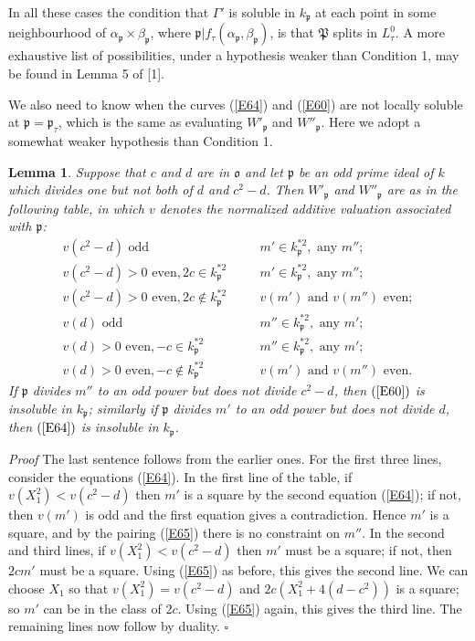 \documentclass[12pt]{article}
\def\fo{{\mathfrak o}}
\def\fp{{\mathfrak p}}
\def\fP{{\mathfrak P}}
\def\ga{{\alpha}}
\def\gb{{\beta}}
\def\gG{{\Gamma}}
\def\qed{{\hfill$\square$}}
\def\ble{\begin{lemma} \label}
\def\ele{\end{lemma}}
\newtheorem{lemma}{Lemma}
\begin{document}
In all these cases the condition that $\gG'$ is soluble in
$k_\fp$ at each point in some neighbourhood of $\ga_\fp\times
\gb_\fp$, where $\fp|f_\tau(\ga_\fp,\gb_\fp)$, is that $\fP$
splits in $L^0_\tau$. A more exhaustive list of possibilities,
under a hypothesis weaker than Condition 1, may be found in
Lemma 5 of [1].

We also need to know when the curves (\ref{E64}) and
(\ref{E60}) are not locally soluble at $\fp=\fp_\tau$, which
is the same as evaluating $W'_\fp$ and $W''_\fp$. Here
we adopt a somewhat weaker hypothesis than Condition 1.
\ble{L24} Suppose that $c$ and $d$ are in $\fo$ and let $\fp$
be an odd prime ideal of $k$ which divides one but not both
of $d$ and $c^2-d$. Then $W'_\fp$ and $W''_\fp$ are as in the
following table, in which $v$ denotes the normalized additive
valuation associated with $\fp$:
\[ \begin{matrix}
v(c^2-d) \text{ odd} & \quad & m'\in k_\fp^{*2}, \text{ any }m''; \\
v(c^2-d)>0 \text{ even}, 2c\in k^{*2}_\fp  & \quad & m'\in k_\fp^{*2}, \text{ any }m''; \\
v(c^2-d)>0 \text{ even}, 2c{\not\in} k^{*2}_\fp  & \quad & v(m')\text{ and $v(m'')$ even}; \\
v(d) \text{ odd} & \quad & m''\in k^{*2}_\fp,\text{ any }m'; \\
v(d)>0 \text{ even},-c\in k^{*2}_\fp & \quad & m''\in k^{*2}_\fp,\text{ any }m'; \\
v(d)>0 \text{ even},-c{\not\in} k^{*2}_\fp & \quad & v(m')\text{ and $v(m'')$ even}.
\end{matrix} \]
If $\fp$ divides $m''$ to an odd power but does not divide
$c^2-d$, then $(\ref{E60})$ is insoluble in $k_\fp$; similarly
if $\fp$ divides $m'$ to an odd power but does not divide
$d$, then $(\ref{E64})$ is insoluble in $k_\fp$.
\ele
\emph{Proof} The last sentence follows from the earlier ones.
For the first three lines, consider the equations (\ref{E64}).
In the first line of the table, if $v(X_1^2)<v(c^2-d)$ then
$m'$ is a square by the second equation (\ref{E64}); if not,
then $v(m')$ is odd and the first equation gives a
contradiction. Hence $m'$ is a square, and by the pairing
(\ref{E65}) there is no constraint on $m''$. In the second and
third lines, if $v(X_1^2)<v(c^2-d)$ then $m'$ must be a square;
if not, then $2cm'$ must be a square. Using (\ref{E65}) as
before, this gives the second line. We can choose $X_1$ so
that $v(X_1^2)=v(c^2-d)$ and $2c(X_1^2+4(d-c^2))$ is a square;
so $m'$ can be in the class of $2c$. Using (\ref{E65}) again,
this gives the third line. The remaining lines now follow by
duality.  \qed
\end{document}
